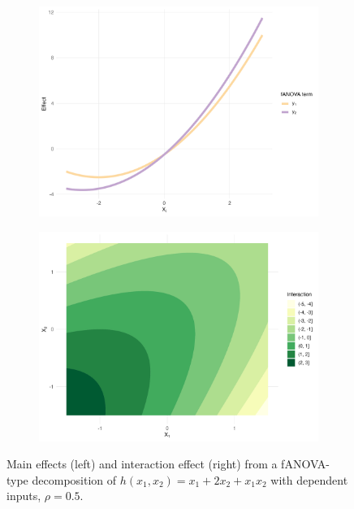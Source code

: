 \begin{figure}[htpb]
    \centering
    \begin{subfigure}[t]{0.49\textwidth}
        \centering
        \includegraphics[width=\textwidth]{images/experiment_section/hoeffding_rho05_main.png}
    \end{subfigure}%
    \hfill
    \begin{subfigure}[t]{0.49\textwidth}
        \centering
        \includegraphics[width=\textwidth]{images/experiment_section/hoeffding_rho05_interaction.png}
    \end{subfigure}
    \caption{Main effects (left) and interaction effect (right) from a fANOVA-type decomposition of $h(x_1, x_2) = x_1 + 2 x_2 + x_1 x_2$ with dependent inputs, $\rho = 0.5$.}
    \label{fig:hoeffding_rho05}
\end{figure}

